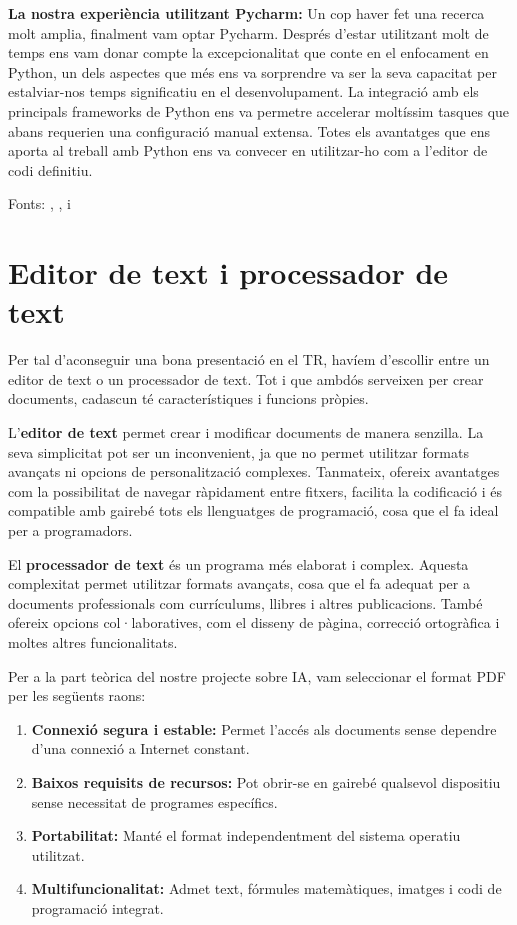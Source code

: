 \textbf{La nostra experiència utilitzant Pycharm:}
Un cop haver fet una recerca molt amplia, finalment vam optar Pycharm. Després d'estar utilitzant molt de temps ens vam donar compte la excepcionalitat que conte en el enfocament en Python, un dels aspectes que més ens va sorprendre va ser la seva capacitat per estalviar-nos temps significatiu en el desenvolupament. La integració amb els principals frameworks de Python ens va permetre accelerar moltíssim tasques que abans requerien una configuració manual extensa.  Totes els avantatges que ens aporta al treball amb Python ens va convecer en utilitzar-ho com a l'editor de codi definitiu.


Fonts: \cite{VSCodeilessevesavantatges}, \cite{FundacioEclipse}, \cite{Totl'hoquehasdesaberdelPycharm} i~\cite{ToteslesnovetatsdePycharm}



\section{Editor de text i processador de text}\label{sec:4.2}

Per tal d'aconseguir una bona presentació en el TR, havíem d’escollir entre un editor de text o un processador de text. Tot i que ambdós serveixen per crear documents, cadascun té característiques i funcions pròpies.

L’\textbf{editor de text} permet crear i modificar documents de manera senzilla. La seva simplicitat pot ser un inconvenient, ja que no permet utilitzar formats avançats ni opcions de personalització complexes. Tanmateix, ofereix avantatges com la possibilitat de navegar ràpidament entre fitxers, facilita la codificació i és compatible amb gairebé tots els llenguatges de programació, cosa que el fa ideal per a programadors.

El \textbf{processador de text} és un programa més elaborat i complex. Aquesta complexitat permet utilitzar formats avançats, cosa que el fa adequat per a documents professionals com currículums, llibres i altres publicacions. També ofereix opcions col·laboratives, com el disseny de pàgina, correcció ortogràfica i moltes altres funcionalitats.

Per a la part teòrica del nostre projecte sobre IA, vam seleccionar el format PDF per les següents raons:
\begin{enumerate}
\item \textbf{Connexió segura i estable:} Permet l’accés als documents sense dependre d’una connexió a Internet constant.
\item \textbf{Baixos requisits de recursos:} Pot obrir-se en gairebé qualsevol dispositiu sense necessitat de programes específics.
\item \textbf{Portabilitat:} Manté el format independentment del sistema operatiu utilitzat.
\item \textbf{Multifuncionalitat:} Admet text, fórmules matemàtiques, imatges i codi de programació integrat.
\end{enumerate}

